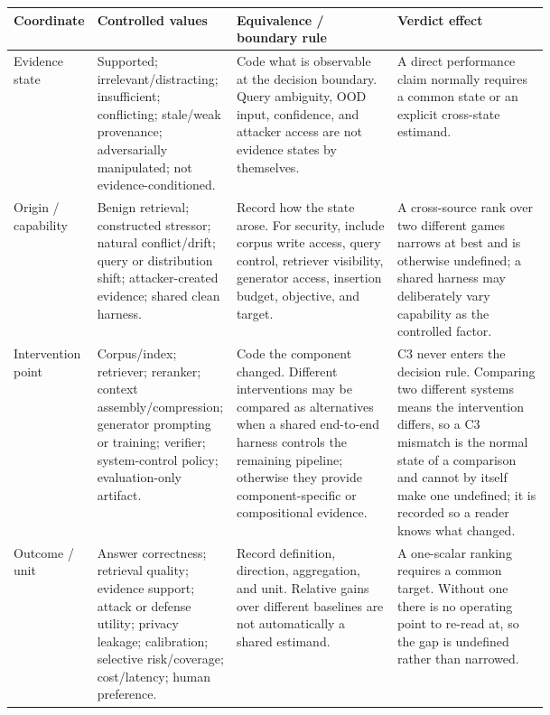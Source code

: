 \begin{table}[t]
\centering
\scriptsize
\renewcommand{\arraystretch}{0.88}
\begin{tabularx}{\linewidth}{>{\raggedright\arraybackslash}p{0.13\linewidth}>{\raggedright\arraybackslash}p{0.26\linewidth}>{\raggedright\arraybackslash}p{0.30\linewidth}X}
\toprule
\textbf{Coordinate} & \textbf{Controlled values} & \textbf{Equivalence / boundary rule} & \textbf{Verdict effect} \\
\midrule
Evidence state & Supported; irrelevant/distracting; insufficient; conflicting; stale/weak provenance; adversarially manipulated; not evidence-conditioned. & Code what is observable at the decision boundary. Query ambiguity, OOD input, confidence, and attacker access are not evidence states by themselves. & A direct performance claim normally requires a common state or an explicit cross-state estimand. \\
Origin / capability & Benign retrieval; constructed stressor; natural conflict/drift; query or distribution shift; attacker-created evidence; shared clean harness. & Record how the state arose. For security, include corpus write access, query control, retriever visibility, generator access, insertion budget, objective, and target. & A cross-source rank over two different games narrows at best and is otherwise undefined; a shared harness may deliberately vary capability as the controlled factor. \\
Intervention point & Corpus/index; retriever; reranker; context assembly/compression; generator prompting or training; verifier; system-control policy; evaluation-only artifact. & Code the component changed. Different interventions may be compared as alternatives when a shared end-to-end harness controls the remaining pipeline; otherwise they provide component-specific or compositional evidence. & C3 never enters the decision rule. Comparing two different systems means the intervention differs, so a C3 mismatch is the normal state of a comparison and cannot by itself make one undefined; it is recorded so a reader knows what changed. \\
Outcome / unit & Answer correctness; retrieval quality; evidence support; attack or defense utility; privacy leakage; calibration; selective risk/coverage; cost/latency; human preference. & Record definition, direction, aggregation, and unit. Relative gains over different baselines are not automatically a shared estimand. & A one-scalar ranking requires a common target. Without one there is no operating point to re-read at, so the gap is undefined rather than narrowed. \\

\end{tabularx}
\end{table}

